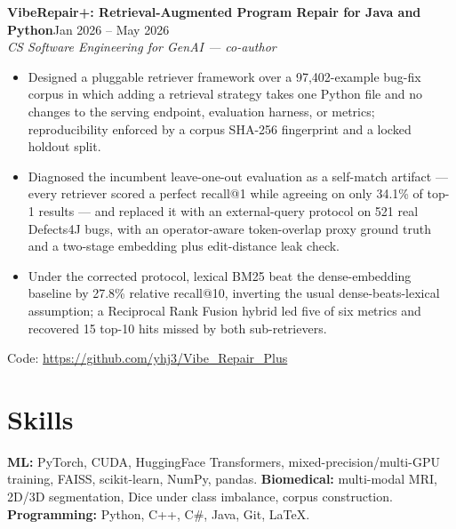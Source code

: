 \documentclass[10pt,letterpaper]{article}
\newcommand{\entry}[3]{\noindent\textbf{#1}\hfill #2\\ \textit{#3}\vspace{1pt}}
\newcommand{\code}[1]{\small Code: \url{#1}}
\begin{document}
\entry{VibeRepair+: Retrieval-Augmented Program Repair for Java and Python}{Jan 2026 -- May 2026}{CS Software Engineering for GenAI --- co-author}
\begin{itemize}
\item Designed a pluggable retriever framework over a 97,402-example bug-fix corpus in which adding a
      retrieval strategy takes one Python file and no changes to the serving endpoint, evaluation
      harness, or metrics; reproducibility enforced by a corpus SHA-256 fingerprint and a locked
      holdout split.
\item Diagnosed the incumbent leave-one-out evaluation as a self-match artifact --- every retriever
      scored a perfect recall@1 while agreeing on only 34.1\% of top-1 results --- and replaced it
      with an external-query protocol on 521 real Defects4J bugs, with an operator-aware token-overlap
      proxy ground truth and a two-stage embedding plus edit-distance leak check.
\item Under the corrected protocol, lexical BM25 beat the dense-embedding baseline by 27.8\% relative
      recall@10, inverting the usual dense-beats-lexical assumption; a Reciprocal Rank Fusion hybrid
      led five of six metrics and recovered 15 top-10 hits missed by both sub-retrievers.
\end{itemize}
\code{https://github.com/yhj3/Vibe_Repair_Plus}

\section*{Skills}
{\small\noindent
\textbf{ML:} PyTorch, CUDA, HuggingFace Transformers, mixed-precision/multi-GPU training, FAISS,
scikit-learn, NumPy, pandas. \textbf{Biomedical:} multi-modal MRI, 2D/3D segmentation, Dice under
class imbalance, corpus construction. \textbf{Programming:} Python, C++, C\#, Java, Git, \LaTeX.}
\end{document}
